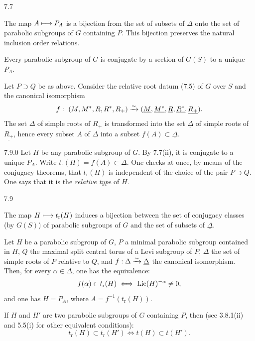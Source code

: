 \begin{proposition}{7.7}\label{XXVI.7.7}
\begin{enumeratei}
\item The map $A\longmapsto P_A$ is a bijection from the set of subsets of $\Delta$ onto the set of parabolic subgroups of $G$ containing $P$. This bijection preserves the natural inclusion order relations.
\item Every parabolic subgroup of $G$ is conjugate by a section of $G(S)$ to a unique $P_A$.
\end{enumeratei}
\end{proposition}

\label{XXVI.7.8}
Let $P\supset Q$ be as above. Consider the relative root datum (7.5) of $G$ over $S$ and the canonical isomorphism
\[
 f:\ (M,M^*,R,R^*,R_+)\isomto
 (\underline M,\underline{M^*},\underline R,\underline{R^*},\underline{R_+}).
\]
The set $\Delta$ of simple roots of $R_+$ is transformed into the set $\underline\Delta$ of simple roots of $\underline{R_+}$, hence every subset $A$ of $\Delta$ into a subset $f(A)\subset\underline\Delta$.

\begin{definition}{7.9.0}\label{XXVI.7.9.0}
Let $H$ be any parabolic subgroup of $G$. By 7.7(ii), it is conjugate to a unique $P_A$. Write $t_{\mathrm r}(H)=f(A)\subset\underline\Delta$. One checks at once, by means of the conjugacy theorems, that $t_{\mathrm r}(H)$ is independent of the choice of the pair $P\supset Q$. One says that it is the \emph{relative type} of $H$.
\end{definition}

\begin{proposition}{7.9}\label{XXVI.7.9}
\begin{enumeratei}
\item The map $H\longmapsto t_{\mathrm r}(H)$ induces a bijection between the set of conjugacy classes (by $G(S)$) of parabolic subgroups of $G$ and the set of subsets of $\underline\Delta$.
\item Let $H$ be a parabolic subgroup of $G$, $P$ a minimal parabolic subgroup contained in $H$, $Q$ the maximal split central torus of a Levi subgroup of $P$, $\Delta$ the set of simple roots of $P$ relative to $Q$, and $f:\Delta\xrightarrow{\sim}\underline\Delta$ the canonical isomorphism. Then, for every $\alpha\in\Delta$, one has the equivalence:
\[
 f(\alpha)\in t_{\mathrm r}(H)\iff\operatorname{Lie}(H)^{-\alpha}\neq0,
\]
and one has $H=P_A$, where $A=f^{-1}(t_{\mathrm r}(H))$.
\item If $H$ and $H'$ are two parabolic subgroups of $G$ containing $P$, then (see 3.8.1(ii) and 5.5(i) for other equivalent conditions):
\[
 t_{\mathrm r}(H)\subset t_{\mathrm r}(H')\iff t(H)\subset t(H').
\]
\end{enumeratei}
\end{proposition}

